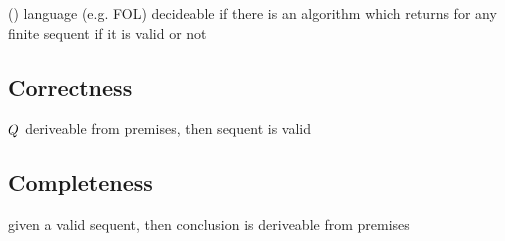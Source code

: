             (\cite{hodges2001ClassicalLogic})
            language (e.g. FOL) decideable if there is an algorithm which returns for any finite sequent if it is valid or not

        \subsection{Correctness}
            \label{sec:correctness}

            $Q$ deriveable from premises, then sequent is valid

        \subsection{Completeness}
            \label{sec:completeness}

            given a valid sequent, then conclusion is deriveable from premises

